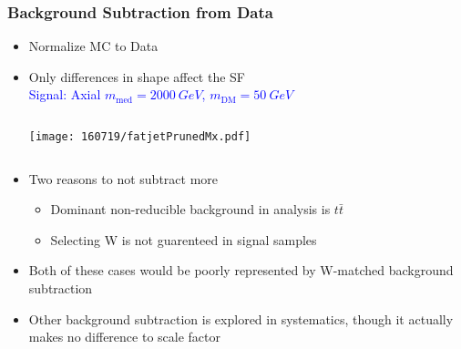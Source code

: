 \documentclass{beamer}
\begin{document}
\begin{frame}
  \frametitle{Background Subtraction from Data}
  \begin{itemize}
  \item Normalize MC to Data
  \item Only differences in shape affect the SF \vspace{-2pt} \\
    \textcolor{blue}{\scriptsize \hspace{-35pt} Signal: Axial
      $m_\text{med} = \SI{2000}{GeV}$,
      $m_\text{DM} = \SI{50}{GeV}$}
    \begin{columns}
      \begin{column}{0.4\linewidth}
        \centering
        \texttt{[image: 160719/fatjetPrunedMx.pdf]}
      \end{column}
    \end{columns}
  \item Two reasons to not subtract more
    \begin{itemize}
    \item Dominant non-reducible background in analysis is $t\bar{t}$
    \item Selecting W is not guarenteed in signal samples
    \end{itemize}
  \item Both of these cases would be poorly represented by
    W-matched background subtraction
  \item Other background subtraction is explored in systematics, though it actually makes no
    difference to scale factor
  \end{itemize}
\end{frame}
\end{document}
